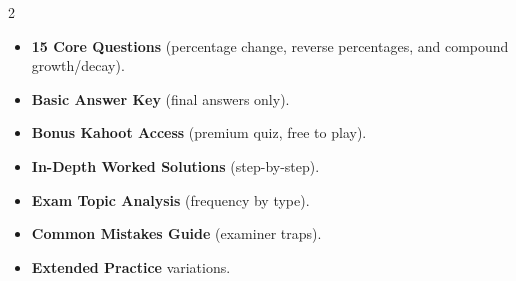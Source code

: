 \documentclass[11pt,a4paper]{article}
\newcommand{\FullReleaseDate}{April 30, 2026}
\begin{document}
\vspace{8pt}

\begin{multicols}{2}
  \begin{tcolorbox}[card, title=\sffamily\bfseries\textcolor{white}{\faHandPointDown\ TODAY (Simplified Version)}, colbacktitle=mainblue, boxed title style={sharp corners, boxrule=0pt}]
    \begin{itemize}[leftmargin=1.2em, itemsep=2pt]
      \item \small \textbf{15 Core Questions} (percentage change, reverse percentages, and compound growth/decay).
      \item \small \textbf{Basic Answer Key} (final answers only).
      \item \small \textbf{Bonus Kahoot Access} (premium quiz, free to play).
    \end{itemize}
  \end{tcolorbox}

  \columnbreak

  \begin{tcolorbox}[card, title=\sffamily\bfseries\textcolor{white}{\faRocket\ ON \FullReleaseDate\ (Full Upgrade)}, colbacktitle=mainblue, boxed title style={sharp corners, boxrule=0pt}]
    \begin{itemize}[leftmargin=1.2em, itemsep=2pt]
      \item \small \textbf{In-Depth Worked Solutions} (step-by-step).
      \item \small \textbf{Exam Topic Analysis} (frequency by type).
      \item \small \textbf{Common Mistakes Guide} (examiner traps).
      \item \small \textbf{Extended Practice} variations.
    \end{itemize}
  \end{tcolorbox}
\end{multicols}
\end{document}
